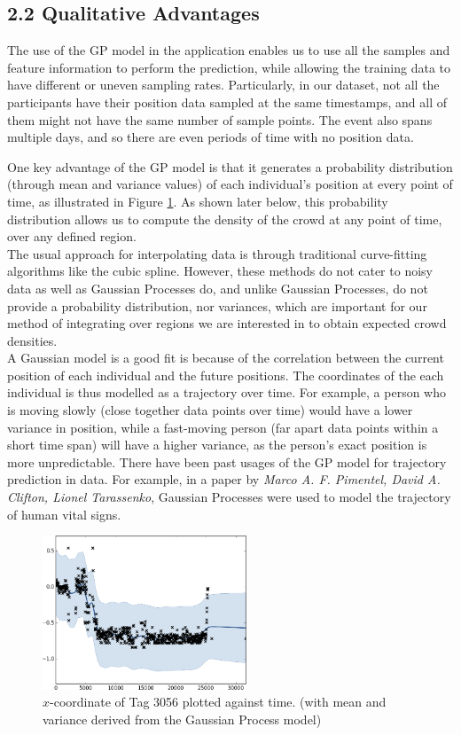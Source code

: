 \documentclass[letterpaper]{article}
\begin{document}
\subsection{2.2  Qualitative Advantages}

The use of the GP model in the application enables us to use all the samples and feature information to perform the prediction, while allowing the training data to have different or uneven sampling rates. Particularly, in our dataset, not all the participants have their position data sampled at the same timestamps, and all of them might not have the same number of sample points. The event also spans multiple days, and so there are even periods of time with no position data.

One key advantage of the GP model is that it generates a probability distribution (through mean and variance values) of each individual's position at every point of time, as illustrated in Figure \ref{fig:GP1}. As shown later below, this probability distribution allows us to compute the density of the crowd at any point of time, over any defined region. \\

The usual approach for interpolating data is through traditional curve-fitting algorithms like the cubic spline. However, these methods do not cater to noisy data as well as Gaussian Processes do, and unlike Gaussian Processes, do not provide a probability distribution, nor variances, which are important for our method of integrating over regions we are interested in to obtain expected crowd densities.\\

A Gaussian model is a good fit is because of the correlation between the current position of each individual and the future positions. The coordinates of the each individual is thus modelled as a trajectory over time. For example, a person who is moving slowly (close together data points over time) would have a lower variance in position, while a fast-moving person (far apart data points within a short time span) will have a higher variance, as the person's exact position is more unpredictable. There have been past usages of the GP model for trajectory prediction in data. For example, in a paper by {\it Marco A. F. Pimentel, David A. Clifton, Lionel Tarassenko}, Gaussian Processes were used to model the trajectory of human vital signs.

\begin{figure}[!h]
  \centering
    \includegraphics[width=230px,natwidth=665,natheight=391]{selected_GP/3056.csv_X.png}
  \caption{$x$-coordinate of Tag 3056 plotted against time. (with mean and variance derived from the Gaussian Process model)}
  \label{fig:GP1}
\end{figure}
\end{document}
